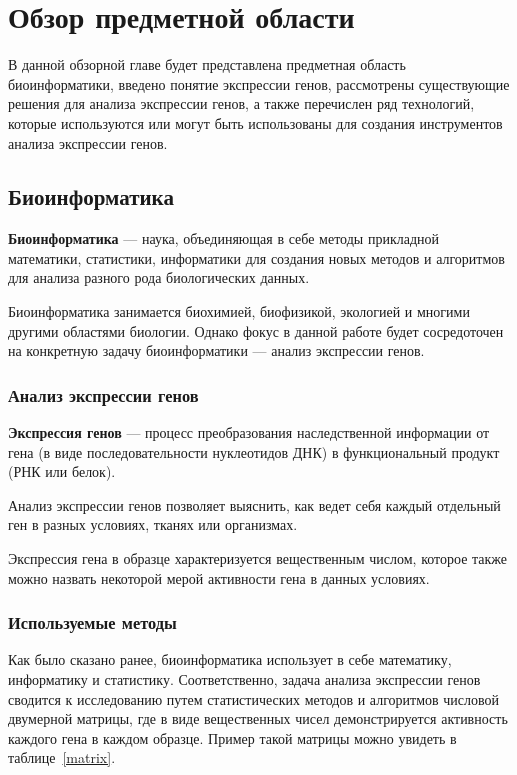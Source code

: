 \chapter{Обзор предметной области}
В данной обзорной главе будет представлена предметная область биоинформатики, введено понятие экспрессии генов, рассмотрены существующие решения для анализа экспрессии генов, а также перечислен ряд технологий, которые используются или могут быть использованы для создания инструментов анализа экспрессии генов.
\section{Биоинформатика}
\textbf{Биоинформатика} --- наука, объединяющая в себе методы прикладной математики, статистики, информатики для создания новых методов и алгоритмов для анализа разного рода биологических данных.

Биоинформатика занимается биохимией, биофизикой, экологией и многими другими областями биологии. Однако фокус в данной работе будет сосредоточен на конкретную задачу биоинформатики --- анализ экспрессии генов.

\subsection{Анализ экспрессии генов}
\textbf{Экспрессия генов} --- процесс преобразования наследственной информации от гена (в виде последовательности нуклеотидов ДНК) в функциональный продукт (РНК или белок).

Анализ экспрессии генов позволяет выяснить, как ведет себя каждый отдельный ген в разных условиях, тканях или организмах.

Экспрессия гена в образце характеризуется вещественным числом, которое также можно назвать некоторой мерой активности гена в данных условиях.

\subsection{Используемые методы}
Как было сказано ранее, биоинформатика использует в себе математику, информатику и статистику. Соответственно, задача анализа экспрессии генов сводится к исследованию путем статистических методов и алгоритмов числовой двумерной матрицы, где в виде вещественных чисел демонстрируется активность каждого гена в каждом образце. Пример такой матрицы можно увидеть в таблице~\ref{matrix}.

